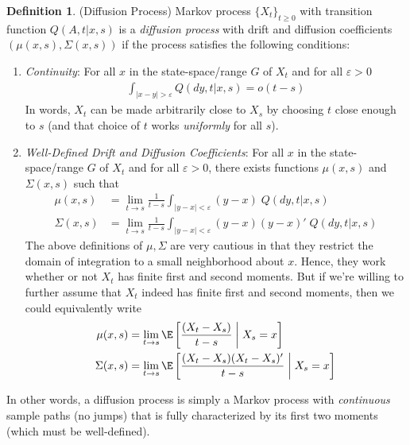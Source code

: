 \documentclass[12pt]{article}
\theoremstyle{plain}
\theoremstyle{definition}
\newtheorem{defn}[thm]{Definition}
\theoremstyle{remark}
\newcommand{\ra}{\rightarrow}
\begin{document}
\clearpage
\begin{defn}(Diffusion Process)
Markov process $\{X_t\}_{t\geq 0}$ with transition function $Q(A,t|x,s)$
is a \emph{diffusion process} with drift and diffusion coefficients
$(\mu(x,s),\Sigma(x,s))$ if the process satisfies the following
conditions:
\begin{enumerate}[label=(\roman*)]
  \item \emph{Continuity}:
    For all $x$ in the state-space/range $G$ of $X_t$ and
    for all $\varepsilon>0$
    \begin{align*}
      \int_{|x-y|>\varepsilon}
      Q(dy,t|x,s)
      =
      o(t-s)
    \end{align*}
    In words, $X_t$ can be made arbitrarily close to $X_s$ by choosing
    $t$ close enough to $s$ (and that choice of $t$ works
    \emph{uniformly} for all $s$).

  \item
    \emph{Well-Defined Drift and Diffusion Coefficients}:
    For all $x$ in the state-space/range $G$ of $X_t$ and
    for all $\varepsilon>0$, there exists functions $\mu(x,s)$ and
    $\Sigma(x,s)$ such that
    \begin{align*}
      \mu(x,s)
      &=
      \lim_{t\ra s}
      \frac{1}{t-s}
      \int_{|y-x|<\varepsilon}
      (y-x)
      \;Q(dy,t|x,s)
      \\
      \Sigma(x,s)
      &=
      \lim_{t\ra s}
      \frac{1}{t-s}
      \int_{|y-x|<\varepsilon}
      (y-x)(y-x)'
      \;Q(dy,t|x,s)
    \end{align*}
    The above definitions of $\mu,\Sigma$ are very cautious in that they
    restrict the domain of integration to a small neighborhood about
    $x$. Hence, they work whether or not $X_t$ has finite first and
    second moments. But if we're willing to further assume that $X_t$
    indeed has finite first and second moments, then we could
    equivalently write
    \begin{align*}
      \mu(x,s)
      &=
      \lim_{t\ra s}
      \E\left[
        \frac{(X_t-X_s)}{t-s}
        \;\bigg|\;
        X_s=x
      \right]
      \\
      \Sigma(x,s)
      &=
      \lim_{t\ra s}
      \E\left[
        \frac{(X_t-X_s)(X_t-X_s)'}{t-s}
        \;\bigg|\;
        X_s=x
      \right]
    \end{align*}
\end{enumerate}
In other words, a diffusion process is simply a Markov process with
\emph{continuous} sample paths (no jumps) that is fully characterized by
its first two moments (which must be well-defined).

\end{defn}
\end{document}
